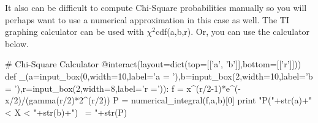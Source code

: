 \documentclass[10pt,]{book}
\numberwithin{equation}{section}
\begin{document}
%
\par
\hypertarget{p-1050}{}%
It also can be difficult to compute Chi-Square probabilities manually so you will perhaps want to use a numerical approximation in this case as well. The TI graphing calculator can be used with \(\chi ^2\)cdf(a,b,r).  Or, you can use the calculator below.%
\par
\hypertarget{p-1051}{}%
\leavevmode%
\begin{sageinput}
# Chi-Square Calculator
@interact(layout=dict(top=[['a', 'b']],bottom=[['r']]))
def _(a=input_box(0,width=10,label='a = '),b=input_box(2,width=10,label='b = '),r=input_box(2,width=8,label='r =')):
    f = x^(r/2-1)*e^(-x/2)/(gamma(r/2)*2^(r/2))
    P = numerical_integral(f,a,b)[0]
    print "P("+str(a)+" < X < "+str(b)+") ~= "+str(P)
\end{sageinput}
%
%
%
\typeout{************************************************}
\typeout{************************************************}
%
\end{document}
